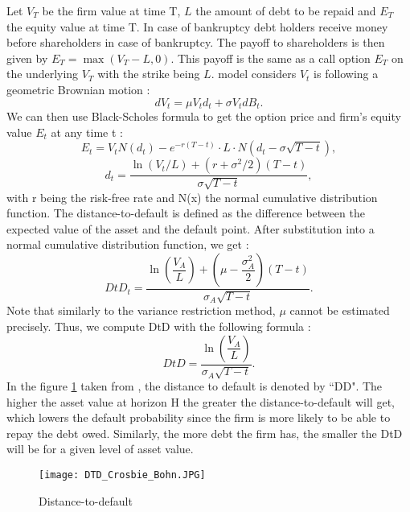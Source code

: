 Let $V_T$ be the firm value at time T, $L$ the amount of debt to be repaid and $E_T$ the equity value at time T. In case of bankruptcy debt holders receive money before shareholders in case of bankruptcy. The payoff to shareholders is then given by $E_T = \max(V_T - L,0)$. This payoff is the same as a call option $E_T$ on the underlying $V_T$ with the strike being $L$. \citet{Merton1974} model considers $V_t$ is following a geometric Brownian motion :
\begin{equation*}
dV_t = \mu V_t d_t + \sigma V_t dB_t.
\end{equation*}
We can then use Black-Scholes formula to get the option price and firm's equity value $E_t$ at any time t :
\begin{equation} \label{blackscholes}
E_t = V_t N(d_t) - e^{-r(T-t)}\cdot L \cdot N(d_t - \sigma \sqrt{T-t}),
\end{equation}
\begin{equation*}
d_t = \dfrac{\ln(V_t/L)+(r+\sigma^2/2)(T-t)}{\sigma \sqrt{T-t}},
\end{equation*}
with r being the risk-free rate and N(x) the normal cumulative distribution function.
The distance-to-default is defined as the difference between the expected value of the asset and the default point. After substitution into a normal cumulative distribution function, we get :
\begin{equation}
DtD_t = \dfrac{\ln(\dfrac{V_A}{L})+(\mu-\dfrac{\sigma_A^2}{2})(T-t)}{\sigma_A \sqrt{T-t}}.
\end{equation}
Note that similarly to the variance restriction method, $\mu$ cannot be estimated precisely. Thus, we compute DtD with the following formula :
\begin{equation}
DtD = \dfrac{\ln(\dfrac{V_A}{L})}{\sigma_A \sqrt{T-t}}.
\end{equation}
In the figure \ref{fig:DD} taken from \citet{KMV}, the distance to default is denoted by ``DD". The higher the asset value at horizon H the greater the distance-to-default will get, which lowers the default probability since the firm is more likely to be able to repay the debt owed. Similarly, the more debt the firm has, the smaller the DtD will be for a given level of asset value.

\begin{figure}[h!]
\centering
\texttt{[image: DTD\_Crosbie\_Bohn.JPG]} 
\caption{Distance-to-default} 
\label{fig:DD}
\end{figure}



